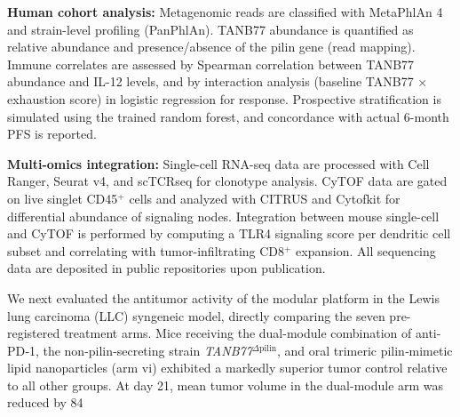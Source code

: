 \documentclass{article}
\begin{document}
\textbf{Human cohort analysis:} Metagenomic reads are classified with MetaPhlAn 4 and strain-level profiling (PanPhlAn). TANB77 abundance is quantified as relative abundance and presence/absence of the pilin gene (read mapping). Immune correlates are assessed by Spearman correlation between TANB77 abundance and IL-12 levels, and by interaction analysis (baseline TANB77 × exhaustion score) in logistic regression for response. Prospective stratification is simulated using the trained random forest, and concordance with actual 6-month PFS is reported.

\textbf{Multi-omics integration:} Single-cell RNA-seq data are processed with Cell Ranger, Seurat v4, and scTCRseq for clonotype analysis. CyTOF data are gated on live singlet CD45$^+$ cells and analyzed with CITRUS and Cytofkit for differential abundance of signaling nodes. Integration between mouse single-cell and CyTOF is performed by computing a TLR4 signaling score per dendritic cell subset and correlating with tumor-infiltrating CD8$^+$ expansion. All sequencing data are deposited in public repositories upon publication.

We next evaluated the antitumor activity of the modular platform in the Lewis lung carcinoma (LLC) syngeneic model, directly comparing the seven pre-registered treatment arms. Mice receiving the dual-module combination of anti-PD‑1, the non‑pilin‑secreting strain \textit{TANB77}$^{\Delta\text{pilin}}$, and oral trimeric pilin‑mimetic lipid nanoparticles (arm vi) exhibited a markedly superior tumor control relative to all other groups. At day 21, mean tumor volume in the dual-module arm was reduced by 84%
\end{document}
